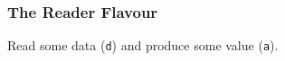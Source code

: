 \begin{frame}[fragile]

\frametitle{The Reader Flavour}

\vspace{\fill}

\begin{center}

Read some data (\texttt{d}) and produce some value (\texttt{a}).

\end{center}




\vspace{\fill}

\end{frame}




%


